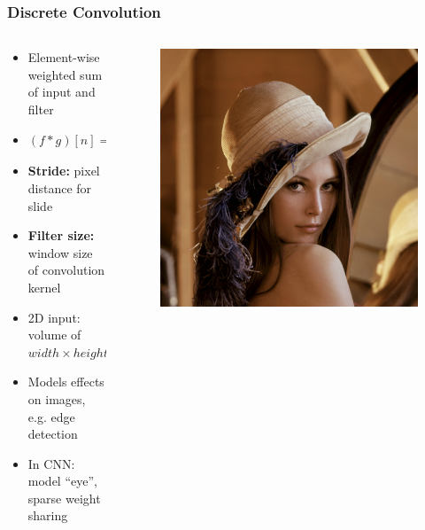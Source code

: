 \documentclass[aspectratio=169]{beamer}
\begin{document}
\begin{frame}
\frametitle{Discrete Convolution}

\begin{columns}
    \begin{column}{0.58\textwidth}
        \begin{itemize}
            \item Element-wise weighted sum of input and filter
            \item $(f*g)[n]=\sum_{m=-\infty}^{\infty}f[m]g[n-m]$
            \item \textbf{Stride:} pixel distance for slide
            \item \textbf{Filter size:} window size of convolution kernel
            \item 2D input: volume of $width\times height(\times channels)$
            \item Models effects on images, e.g. edge detection
            \item In CNN: model ``eye'', sparse weight sharing
        \end{itemize}
    \end{column}
    \begin{column}{0.38\textwidth}
        \begin{figure}
            \centering
            \includegraphics[height=0.38\textheight]{lena.jpg}\\

\end{figure}
\end{column}
\end{columns}
\end{frame}
\end{document}
